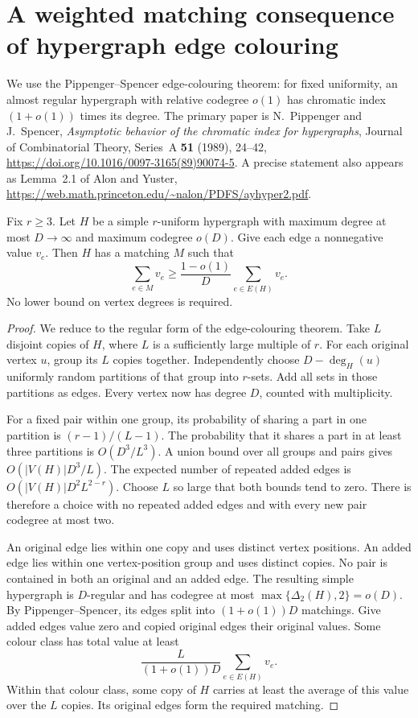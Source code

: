 \section{A weighted matching consequence of hypergraph edge colouring}
\label{sec:rhost-weighted-matching}

We use the Pippenger--Spencer edge-colouring theorem:
for fixed uniformity, an almost regular hypergraph with relative codegree $o(1)$ has chromatic index $(1+o(1))$ times its degree.
The primary paper is
N.~Pippenger and J.~Spencer, \emph{Asymptotic behavior of the chromatic index for hypergraphs},
Journal of Combinatorial Theory, Series~A \textbf{51} (1989), 24--42,
\url{https://doi.org/10.1016/0097-3165(89)90074-5}.
A precise statement also appears as Lemma~2.1 of Alon and Yuster,
\url{https://web.math.princeton.edu/~nalon/PDFS/ayhyper2.pdf}.

\begin{lemma}\label{lem:rhost-max-degree-colouring}
Fix $r\ge3$.
Let $H$ be a simple $r$-uniform hypergraph with maximum degree at most $D\to\infty$ and maximum codegree $o(D)$.
Give each edge a nonnegative value $v_e$.
Then $H$ has a matching $M$ such that
\[
 \sum_{e\in M}v_e\ge\frac{1-o(1)}D\sum_{e\in E(H)}v_e.
\]
No lower bound on vertex degrees is required.
\end{lemma}

\begin{proof}
We reduce to the regular form of the edge-colouring theorem.
Take $L$ disjoint copies of $H$, where $L$ is a sufficiently large multiple of $r$.
For each original vertex $u$, group its $L$ copies together.
Independently choose $D-\deg_H(u)$ uniformly random partitions of that group into $r$-sets.
Add all sets in those partitions as edges.
Every vertex now has degree $D$, counted with multiplicity.

For a fixed pair within one group, its probability of sharing a part in one partition is $(r-1)/(L-1)$.
The probability that it shares a part in at least three partitions is $O(D^3/L^3)$.
A union bound over all groups and pairs gives $O(|V(H)|D^3/L)$.
The expected number of repeated added edges is $O(|V(H)|D^2L^{2-r})$.
Choose $L$ so large that both bounds tend to zero.
There is therefore a choice with no repeated added edges and with every new pair codegree at most two.

An original edge lies within one copy and uses distinct vertex positions.
An added edge lies within one vertex-position group and uses distinct copies.
No pair is contained in both an original and an added edge.
The resulting simple hypergraph is $D$-regular and has codegree at most $\max\{\Delta_2(H),2\}=o(D)$.
By Pippenger--Spencer, its edges split into $(1+o(1))D$ matchings.
Give added edges value zero and copied original edges their original values.
Some colour class has total value at least
\[
 \frac{L}{(1+o(1))D}\sum_{e\in E(H)}v_e.
\]
Within that colour class, some copy of $H$ carries at least the average of this value over the $L$ copies.
Its original edges form the required matching.
\end{proof}

